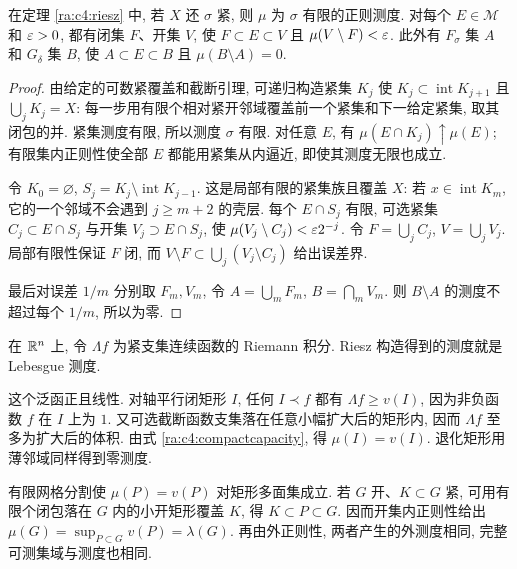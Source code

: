\begin{proposition}\label{ra:c4:sigmacompact}
在定理 \ref{ra:c4:riesz} 中, 若 $X$ 还 $\sigma$ 紧, 则 $\mu$ 为 $\sigma$ 有限的正则测度. 对每个 $E\in\mathcal M$ 和 $\varepsilon>0$, 都有闭集 $F$、开集 $V$, 使 $F\subset E\subset V$ 且 $\mu(V\setminus F)<\varepsilon$. 此外有 $F_\sigma$ 集 $A$ 和 $G_\delta$ 集 $B$, 使 $A\subset E\subset B$ 且 $\mu(B\setminus A)=0$.
\end{proposition}
\begin{proof}
由给定的可数紧覆盖和截断引理, 可递归构造紧集 $K_j$ 使 $K_j\subset\operatorname{int}K_{j+1}$ 且 $\bigcup_jK_j=X$: 每一步用有限个相对紧开邻域覆盖前一个紧集和下一给定紧集, 取其闭包的并. 紧集测度有限, 所以测度 $\sigma$ 有限. 对任意 $E$, 有 $\mu(E\cap K_j)\uparrow\mu(E)$; 有限集内正则性使全部 $E$ 都能用紧集从内逼近, 即使其测度无限也成立.

令 $K_0=\varnothing$, $S_j=K_j\setminus\operatorname{int}K_{j-1}$. 这是局部有限的紧集族且覆盖 $X$: 若 $x\in\operatorname{int}K_m$, 它的一个邻域不会遇到 $j\ge m+2$ 的壳层. 每个 $E\cap S_j$ 有限, 可选紧集 $C_j\subset E\cap S_j$ 与开集 $V_j\supset E\cap S_j$, 使 $\mu(V_j\setminus C_j)<\varepsilon2^{-j}$. 令 $F=\bigcup_jC_j$, $V=\bigcup_jV_j$. 局部有限性保证 $F$ 闭, 而 $V\setminus F\subset\bigcup_j(V_j\setminus C_j)$ 给出误差界.

最后对误差 $1/m$ 分别取 $F_m,V_m$, 令 $A=\bigcup_mF_m$, $B=\bigcap_mV_m$. 则 $B\setminus A$ 的测度不超过每个 $1/m$, 所以为零.
\end{proof}

\begin{example}\label{ra:c4:riemannriesz}
在 $\mathbb R^n$ 上, 令 $\Lambda f$ 为紧支集连续函数的 Riemann 积分. Riesz 构造得到的测度就是 Lebesgue 测度.
\end{example}
\begin{solution}
这个泛函正且线性. 对轴平行闭矩形 $I$, 任何 $I\prec f$ 都有 $\Lambda f\ge v(I)$, 因为非负函数 $f$ 在 $I$ 上为 $1$. 又可选截断函数支集落在任意小幅扩大后的矩形内, 因而 $\Lambda f$ 至多为扩大后的体积. 由式 \eqref{ra:c4:compactcapacity}, 得 $\mu(I)=v(I)$. 退化矩形用薄邻域同样得到零测度.

有限网格分割使 $\mu(P)=v(P)$ 对矩形多面集成立. 若 $G$ 开、$K\subset G$ 紧, 可用有限个闭包落在 $G$ 内的小开矩形覆盖 $K$, 得 $K\subset P\subset G$. 因而开集内正则性给出 $\mu(G)=\sup_{P\subset G}v(P)=\lambda(G)$. 再由外正则性, 两者产生的外测度相同, 完整可测集域与测度也相同.
\end{solution}


